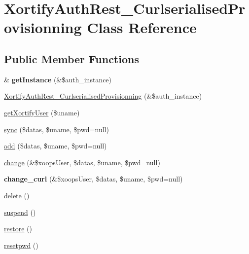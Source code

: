 \hypertarget{class_xortify_auth_rest___curlserialised_provisionning}{\section{Xortify\-Auth\-Rest\-\_\-\-Curlserialised\-Provisionning Class Reference}
\label{class_xortify_auth_rest___curlserialised_provisionning}
}
\subsection*{Public Member Functions}
\begin{DoxyCompactItemize}
\item 
\hypertarget{class_xortify_auth_rest___curlserialised_provisionning_aa07fe91f2a7c4771d35a61e875ba9b9a}{\& {\bfseries get\-Instance} (\&\$auth\-\_\-instance)}\label{class_xortify_auth_rest___curlserialised_provisionning_aa07fe91f2a7c4771d35a61e875ba9b9a}

\item 
\hyperlink{class_xortify_auth_rest___curlserialised_provisionning_a2e2c80e77e1aea92f256b7e468528f38}{Xortify\-Auth\-Rest\-\_\-\-Curlserialised\-Provisionning} (\&\$auth\-\_\-instance)
\item 
\hyperlink{class_xortify_auth_rest___curlserialised_provisionning_a0e56fc856b4163822375dba4a66bdde7}{get\-Xortify\-User} (\$uname)
\item 
\hyperlink{class_xortify_auth_rest___curlserialised_provisionning_a87ea4bc5f7843593a7d3fbb306d87137}{sync} (\$datas, \$uname, \$pwd=null)
\item 
\hyperlink{class_xortify_auth_rest___curlserialised_provisionning_abf31e0cfffedee23e81299a57249ea85}{add} (\$datas, \$uname, \$pwd=null)
\item 
\hyperlink{class_xortify_auth_rest___curlserialised_provisionning_a50770d8a0337d87e75635c96dc5d58ff}{change} (\&\$xoops\-User, \$datas, \$uname, \$pwd=null)
\item 
\hypertarget{class_xortify_auth_rest___curlserialised_provisionning_a35571cfbf8c1c2401fc8e2f3bf4bbd53}{{\bfseries change\-\_\-curl} (\&\$xoops\-User, \$datas, \$uname, \$pwd=null)}\label{class_xortify_auth_rest___curlserialised_provisionning_a35571cfbf8c1c2401fc8e2f3bf4bbd53}

\item 
\hyperlink{class_xortify_auth_rest___curlserialised_provisionning_a8e4717823dbbe400f1b183bc1065e6d3}{delete} ()
\item 
\hyperlink{class_xortify_auth_rest___curlserialised_provisionning_aba3a2bf61e2ce850383e5c50f757cfe8}{suspend} ()
\item 
\hyperlink{class_xortify_auth_rest___curlserialised_provisionning_a3d128ef319cfc2cfd4eb8dd3d7abdf22}{restore} ()
\item 
\hyperlink{class_xortify_auth_rest___curlserialised_provisionning_a2be1b93c1e3a7649c99237a4b1bf8594}{resetpwd} ()
\end{DoxyCompactItemize}

